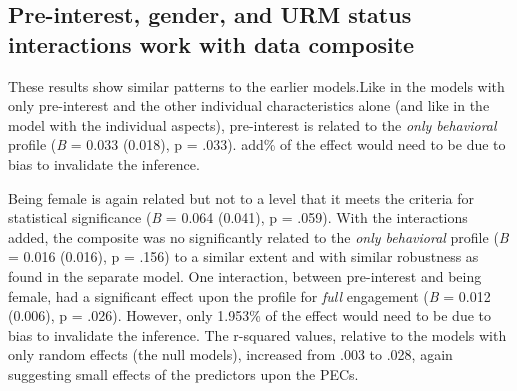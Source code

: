 \documentclass[]{msu-thesis}
\theoremstyle{definition}
\theoremstyle{definition}
\theoremstyle{definition}
\theoremstyle{remark}
\begin{document}
\begin{landscape}\begin{table}

\caption{\label{tab:unnamed-chunk-14}Results of mixed effects models with interest and other characteristics}
\centering
{}
\end{table}
\end{landscape}

\subsection{Pre-interest, gender, and URM status interactions work with
data
composite}\label{pre-interest-gender-and-urm-status-interactions-work-with-data-composite}

These results show similar patterns to the earlier models.Like in the
models with only pre-interest and the other individual characteristics
alone (and like in the model with the individual aspects), pre-interest
is related to the \emph{only behavioral} profile (\emph{B} = 0.033
(0.018), p = .033). add\% of the effect would need to be due to bias to
invalidate the inference.

Being female is again related but not to a level that it meets the
criteria for statistical significance (\emph{B} = 0.064 (0.041), p =
.059). With the interactions added, the composite was no significantly
related to the \emph{only behavioral} profile (\emph{B} = 0.016 (0.016),
p = .156) to a similar extent and with similar robustness as found in
the separate model. One interaction, between pre-interest and being
female, had a significant effect upon the profile for \emph{full}
engagement (\emph{B} = 0.012 (0.006), p = .026). However, only 1.953\%
of the effect would need to be due to bias to invalidate the inference.
The r-squared values, relative to the models with only random effects
(the null models), increased from .003 to .028, again suggesting small
effects of the predictors upon the PECs.
\end{document}
